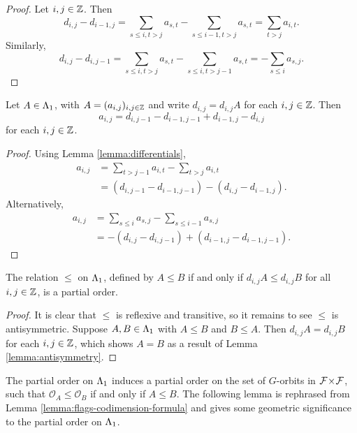 \documentclass[a4paper, 11pt]{report}
\begin{document}
\begin{proof}
Let $i,j\in\mathbb{Z}$. Then
\begin{equation*}
d_{i,j} - d_{i-1,j} = \sum_{s\le i,t>j}a_{s,t} - \sum_{s\le i-1,t>j}a_{s,t} = \sum_{t>j}a_{i,t}.
\end{equation*}
Similarly,
\begin{equation*}
d_{i,j}-d_{i,j-1} = \sum_{s\le i,t>j}a_{s,t} - \sum_{s\le i,t>j-1}a_{s,t} = -\sum_{s\le i}a_{s,j}.
\end{equation*}
\end{proof}

\begin{lemma}\label{lemma:antisymmetry}
Let $A\in{\Lambda_1}$, with $A = (a_{i,j})_{i,j\in\mathbb{Z}}$ and write $d_{i,j}=d_{i,j}A$ for each $i,j\in\mathbb{Z}$. Then
\begin{equation*}
a_{i,j} = d_{i,j-1} - d_{i-1,j-1} + d_{i-1,j} - d_{i,j}
\end{equation*}
for each $i,j\in\mathbb{Z}$.
\end{lemma}
\begin{proof}
Using Lemma \ref{lemma:differentials},
\begin{align*}
a_{i,j}
&= \sum_{t>j-1}a_{i,t} - \sum_{t>j}a_{i,t}\\
&= (d_{i,j-1} - d_{i-1,j-1}) - (d_{i,j} - d_{i-1,j}).
\end{align*}
Alternatively,
\begin{align*}
a_{i,j}
&= \sum_{s\le i}a_{s,j} - \sum_{s\le i-1}a_{s,j}\\
&= -(d_{i,j}-d_{i,j-1}) + (d_{i-1,j} - d_{i-1,j-1}).
\end{align*}
\end{proof}

\begin{lemma}\label{lemma:orbit-poset}
The relation $\le$ on ${\Lambda_1}$, defined by $A\le B$ if and only if $d_{i,j}A\le d_{i,j}B$ for all $i,j\in\mathbb{Z}$, is a partial order.
\end{lemma}

\begin{proof}
It is clear that $\le$ is reflexive and transitive, so it remains to see $\le$ is antisymmetric. Suppose $A,B\in{\Lambda_1}$ with $A\le B$ and $B\le A$. Then $d_{i,j}A = d_{i,j}B$ for each $i,j\in\mathbb{Z}$, which shows $A=B$ as a result of Lemma \ref{lemma:antisymmetry}.  
\end{proof}

The partial order on ${\Lambda_1}$ induces a partial order on the set of $G$-orbits in ${\mathcal{F}\!\times\!\mathcal{F}}$, such that $\mathcal{O}_A\le \mathcal{O}_B$ if and only if $A\le B$. The following lemma is rephrased from Lemma \ref{lemma:flags-codimension-formula} and gives some geometric significance to the partial order on ${\Lambda_1}$.
\end{document}

